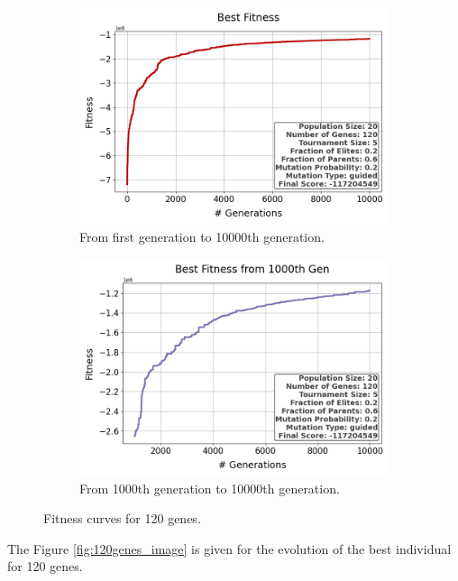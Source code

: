 \documentclass{assignment}
\begin{document}
\begin{figure}[H]
    \begin{subfigure}{0.5\textwidth}
        \includegraphics[width=\textwidth]{figures/best_fitness_output_20_120_5_0.2_0.6_0.2_guided.png}
        \caption{From first generation to 10000th generation.}
    \end{subfigure}\hfill
    \begin{subfigure}{0.5\textwidth}
        \includegraphics[width=\textwidth]{figures/best_fitness_1000_output_20_120_5_0.2_0.6_0.2_guided.png}
        \caption{From 1000th generation to 10000th generation.}
    \end{subfigure}
    \caption{Fitness curves for 120 genes.}
\label{fig:120genes}
\end{figure}

The Figure \ref{fig:120genes_image} is given for the evolution of the best individual for 120 genes.
\end{document}
